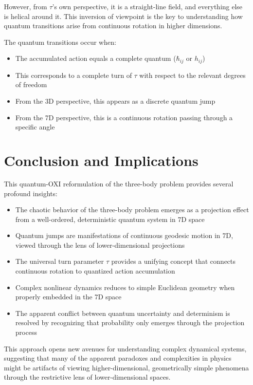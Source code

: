 \documentclass{article}
\begin{document}
However, from $\tau$'s own perspective, it is a straight-line field, and everything else is helical around it. This inversion of viewpoint is the key to understanding how quantum transitions arise from continuous rotation in higher dimensions.

The quantum transitions occur when:
\begin{itemize}
\item The accumulated action equals a complete quantum ($\hbar_{ij}$ or $h_{ij}$)
\item This corresponds to a complete turn of $\tau$ with respect to the relevant degrees of freedom
\item From the 3D perspective, this appears as a discrete quantum jump
\item From the 7D perspective, this is a continuous rotation passing through a specific angle
\end{itemize}

\section{Conclusion and Implications}

This quantum-OXI reformulation of the three-body problem provides several profound insights:

\begin{itemize}
\item The chaotic behavior of the three-body problem emerges as a projection effect from a well-ordered, deterministic quantum system in 7D space
\item Quantum jumps are manifestations of continuous geodesic motion in 7D, viewed through the lens of lower-dimensional projections
\item The universal turn parameter $\tau$ provides a unifying concept that connects continuous rotation to quantized action accumulation
\item Complex nonlinear dynamics reduces to simple Euclidean geometry when properly embedded in the 7D space
\item The apparent conflict between quantum uncertainty and determinism is resolved by recognizing that probability only emerges through the projection process
\end{itemize}

This approach opens new avenues for understanding complex dynamical systems, suggesting that many of the apparent paradoxes and complexities in physics might be artifacts of viewing higher-dimensional, geometrically simple phenomena through the restrictive lens of lower-dimensional spaces.
\end{document}
